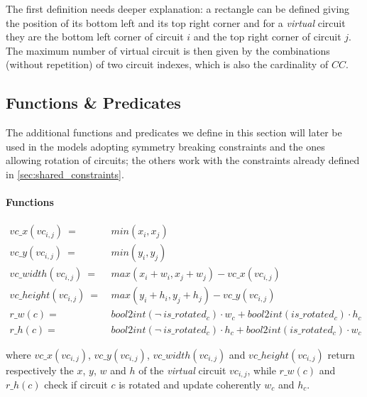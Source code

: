     The first definition needs deeper explanation: a rectangle can be defined giving the position
    of its bottom left and its top right corner and for a \textit{virtual} circuit they are the
    bottom left corner of circuit $i$ and the top right corner of circuit $j$.
    The maximum number of virtual circuit is then given by the combinations (without repetition)
    of two circuit indexes, which is also the cardinality of $CC$. 

    


\subsection{Functions \& Predicates} \label{sec:CP_functions_predicates}
    The additional functions and predicates we define in this section will later be used in the models
    adopting symmetry breaking constraints and the ones allowing rotation of circuits; the others work 
    with the constraints already defined in \ref{sec:shared_constraints}.
    
    \paragraph{Functions}
    \begin{align}
        vc\_x(vc_{i,j})\        =\ & min(x_i, x_j)                                                  \\
        vc\_y(vc_{i,j})\        =\ & min(y_i, y_j)                                                  \\
        vc\_width(vc_{i,j})\    =\ & max(x_i + w_i, x_j + w_j) - vc\_x(vc_{i,j})                    \\
        vc\_height(vc_{i,j})\   =\ & max(y_i + h_i, y_j + h_j) - vc\_y(vc_{i,j})                    \\
        r\_w(c) =\  & bool2int(\neg\ is\_rotated_c) \cdot w_c + bool2int(is\_rotated_c) \cdot h_c   
        \label{eq:CP_r_w}   \\
        r\_h(c) =\  & bool2int(\neg\ is\_rotated_c) \cdot h_c + bool2int(is\_rotated_c) \cdot w_c   
        \label{eq:CP_r_h}
    \end{align}

    where $vc\_x(vc_{i,j})$, $vc\_y(vc_{i,j})$, $vc\_width(vc_{i,j})$ and $vc\_height(vc_{i,j})$ 
    return respectively the $x$, $y$, $w$ and $h$ of the \textit{virtual} circuit $vc_{i,j}$, while 
    $r\_w(c)$ and $r\_h(c)$ check if circuit $c$ is rotated and update coherently $w_c$ and $h_c$.

